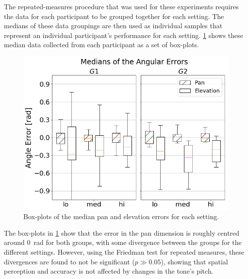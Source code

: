 \documentclass{article}
\begin{document}
The repeated-measures procedure that was used for these experiments requires the data for each participant to be grouped together for each setting.
The medians of these data groupings are then used as individual samples that represent an individual participant's performance for each setting.
\cref{fig:target-boxplot-error} shows these median data collected from each participant as a set of box-plots.

\begin{figure}
  \centering
  \includegraphics[width=1.0\textwidth]{figures/boxplot_target_search_median_error.png}
  \caption{Box-plots of the median pan and elevation errors for each setting. }\label{fig:target-boxplot-error}
\end{figure}

The box-plots in \cref{fig:target-boxplot-error} show that the error in the pan dimension is roughly centred around \SI{0}{\radian} for both groups, with some divergence between the groups for the different settings.
However, using the Friedman test for repeated measures, these divergences are found to not be significant ($p \gg 0.05$), showing that spatial perception and accuracy is not affected by changes in the tone's pitch.
\end{document}
